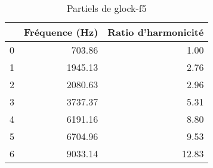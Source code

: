 \begin{table}
\centering
\caption{Partiels de glock-f5}
\label{table:partiels-glock-f5.wav}
\begin{tabular}{lrr}
\toprule
{} &  Fréquence (Hz) &  Ratio d'harmonicité \\
\midrule
0 &          703.86 &                 1.00 \\
1 &         1945.13 &                 2.76 \\
2 &         2080.63 &                 2.96 \\
3 &         3737.37 &                 5.31 \\
4 &         6191.16 &                 8.80 \\
5 &         6704.96 &                 9.53 \\
6 &         9033.14 &                12.83 \\
\bottomrule
\end{tabular}
\end{table}
